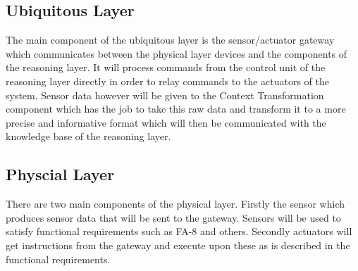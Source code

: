 \subsection{Ubiquitous Layer}
The main component of the ubiquitous layer is the sensor/actuator gateway which communicates between the physical layer devices and the components of the reasoning layer. It will process commands from the control unit of the reasoning layer directly in order to relay commands to the actuators of the system. Sensor data however will be given to the Context Transformation component which has the job to take this raw data and transform it to a more precise and informative format which will then be communicated with the knowledge base of the reasoning layer.

\subsection{Physcial Layer}
There are two main components of the physical layer. Firstly the sensor which produces sensor data that will be sent to the gateway. Sensors will be used to satisfy functional requirements such as FA-8 and others. Secondly actuators will get instructions from the gateway and execute upon these as is described in the functional requirements.
